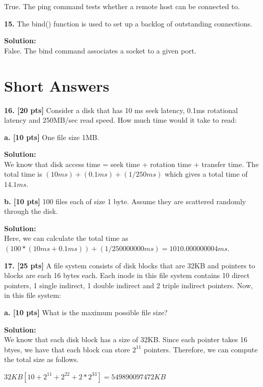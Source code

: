 \documentclass[12pt]{article}
\begin{document}
True. The ping command tests whether a remote host can be connected to. 

{\bf 15.} The bind() function is used to set up a backlog of outstanding connections. 

{\bf Solution:}\\

False. The bind command associates a socket to a given port. 

\section{Short Answers}

{\bf 16. [20 pts]} Consider a disk that has 10 ms seek latency, 0.1ms rotational latency and 250MB/sec read speed. How much time would it take to read:

{\bf a. [10 pts]} One file size 1MB. 

{\bf Solution:}\\

We know that disk access time = seek time + rotation time + transfer time. The total time is $(10ms)+(0.1ms)+(1/250ms)$ which gives a total time of $14.1ms$. 

{\bf b. [10 pts]} 100 files each of size 1 byte. Assume they are scattered randomly through the disk. 

{\bf Solution:}\\

Here, we can calculate the total time as $(100*(10ms+0.1ms))+(1/250000000ms)=1010.000000004ms$. 

{\bf 17. [25 pts]} A file system consists of disk blocks that are 32KB and pointers to blocks are each 16 bytes each. Each inode in this file system contains 10 direct pointers, 1 single indirect, 1 double indirect and 2 triple indirect pointers. Now, in this file system:

{\bf a. [10 pts]} What is the maximum possible file size?

{\bf Solution:}\\

We know that each disk block has a size of 32KB. Since each pointer takes 16 btyes, we have that each block can store $2^{11}$ pointers. Therefore, we can compute the total size as follows.

\begin{center}
$32KB[10+2^{11}+2^{22}+2*2^{33}]=549890097472KB$\\
\end{center}
\end{document}
